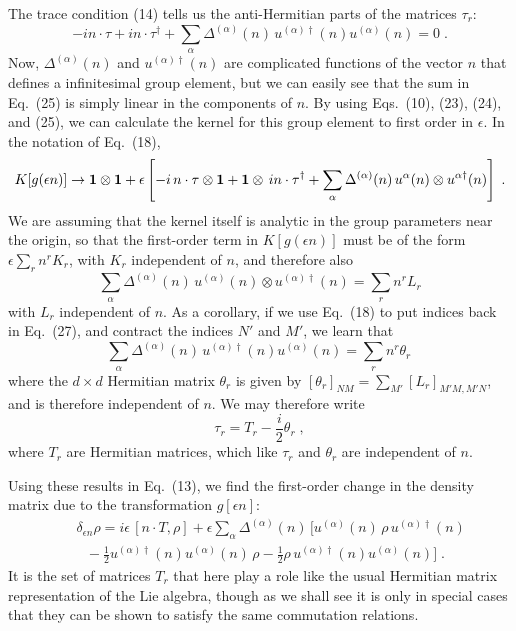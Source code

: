 \documentclass[12pt]{article}
\def\BM#1{\mbox{\boldmath{$#1$}}}
\begin{document}
The trace condition (14) tells us the anti-Hermitian parts of the matrices $\tau_r$:
\begin{equation}
-in\cdot \tau  +i n\cdot\tau^\dagger+\sum_\alpha \Delta^{(\alpha)}(n)\,u^{(\alpha)\dagger}(n) u^{(\alpha)}(n)=0\;.
\end{equation}
Now, $\Delta^{(\alpha)}(n)$ and  $u^{(\alpha)\dagger}(n)$ are complicated functions of the vector $n$ that defines a infinitesimal group element, but we can easily see that the sum in Eq.~(25) is simply linear in the components of $n$.   By using Eqs.~(10), (23), (24), and (25), we can calculate the kernel for this group element to first order in $\epsilon $. In the notation of Eq.~(18),
\begin{equation}
K[g(\epsilon n)]\rightarrow {\BM 1}\otimes {\BM 1}+\epsilon\left[-i\, n\cdot \tau\otimes \BM{1}+\BM{1}\otimes \,in\cdot\tau^\dagger
+\sum_\alpha \Delta^{(\alpha)}(n)\,u^{\alpha}(n)\otimes u^{\alpha\dagger}(n)\right]\;.
\end{equation}
We are assuming that the kernel itself is analytic in the group parameters near the origin, so that 
the first-order term in $K[g(\epsilon n)]$ must be of the form $\epsilon 
\sum_r n^r K_r$, with $K_r$ independent of $n$, and therefore also
\begin{equation}
\sum_\alpha \Delta^{(\alpha)}(n)\,u^{(\alpha)}(n)\otimes u^{(\alpha)\dagger}(n)=\sum_r n^r L_r
\end{equation}
with $L_r$ independent of $n$.  As a corollary, if we use Eq.~(18) to put indices back in Eq.~(27), and contract the indices $N'$ and $M'$, we learn that 
\begin{equation}
\sum_\alpha \Delta^{(\alpha)}(n)\,u^{(\alpha)\dagger}(n) u^{(\alpha)}(n)=\sum_r n^r \theta_r\,
\end{equation}
where the  $d\times d$ Hermitian matrix $\theta_r$ is given by $[\theta_r]_{NM}=\sum_{M'}[L_r]_{M'M,M'N}$, and is therefore independent of $n$.
We may therefore write
\begin{equation}
\tau_r=T_r-\frac{i}{2}\theta_r\;,
\end{equation}
where $T_r$ are  Hermitian matrices, which like $\tau_r$ and $\theta_r$ are independent of $n$.  

Using these results in Eq.~(13), we find the first-order change in the density matrix due to the transformation $g[\epsilon n]$:
\begin{eqnarray}
&&\delta_{\epsilon n} \rho=i\epsilon\,[n\cdot T,\rho]+\epsilon\sum_\alpha  \Delta^{(\alpha)}(n)\,\Bigg[u^{(\alpha)}(n)\,\rho\, u^{(\alpha)\dagger}(n)\nonumber\\&&~~~
-\frac{1}{2}u^{(\alpha)\dagger}(n)u^{(\alpha)}(n)\,\rho
-\frac{1}{2}\rho\, u^{(\alpha)\dagger}(n)u^{(\alpha)}(n)\Bigg]\;.
\end{eqnarray}
It is the set of matrices $T_r$ that here play a role like the usual Hermitian  matrix representation of the Lie algebra, though as we shall see it is only in special cases that they can be shown to satisfy the same commutation relations.
\end{document}
